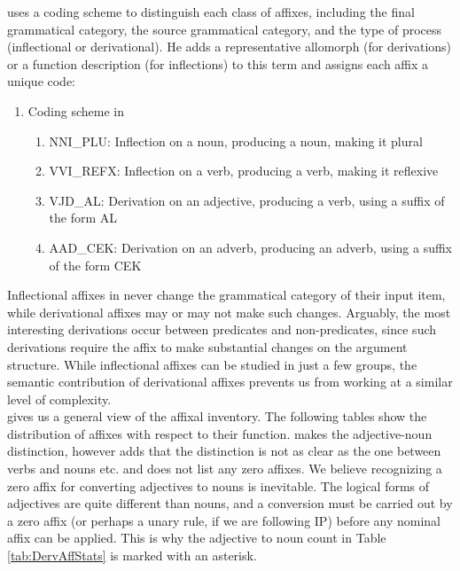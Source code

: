 \documentclass[11pt]{article} %
\begin{document}
\citet{Bozsahin2018} uses a coding scheme to distinguish each class of affixes, including the final grammatical category, the source grammatical category, and the type of process (inflectional or derivational). He adds a representative allomorph (for derivations) or a function description (for inflections) to this term and assigns each affix a unique code:

\begin{enumerate}[resume*]
	\item Coding scheme in \citet{Bozsahin2018}
	\begin{enumerate}[label=(\alph*), ref=(\alph*)]\itemsep1pt
	\item NNI\_PLU: Inflection on a noun, producing a noun, making it plural
	\item VVI\_REFX: Inflection on a verb, producing a verb, making it reflexive
	\item VJD\_AL: Derivation on an adjective, producing a verb, using a suffix of the form AL
	\item AAD\_CEK: Derivation on an adverb, producing an adverb, using a suffix of the form CEK
	\end{enumerate}
\end{enumerate}

Inflectional affixes in \citet{Bozsahin2018} never change the grammatical category of their input item, while derivational affixes may or may not make such changes. Arguably, the most interesting derivations occur between predicates and non-predicates, since such derivations require the affix to make substantial changes on the argument structure. While inflectional affixes can be studied in just a few groups, the semantic contribution of derivational affixes prevents us from working at a similar level of complexity. \\

\citet{Bozsahin2018} gives us a general view of the affixal inventory. The following tables show the distribution of affixes with respect to their function. \citet{Bozsahin2018} makes the adjective-noun distinction, however adds that the distinction is not as clear as the one between verbs and nouns etc. and does not list any zero affixes. We believe recognizing a zero affix for converting adjectives to nouns is inevitable. The logical forms of adjectives are quite different than nouns, and a conversion must be carried out by a zero affix (or perhaps a unary rule, if we are following IP) before any nominal affix can be applied. This is why the adjective to noun count in Table \ref{tab:DervAffStats} is marked with an asterisk. \\
\end{document}
